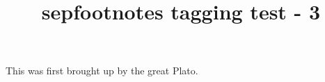 \documentclass{article}
\title{sepfootnotes tagging test - 3}
\begin{document}
This was first brought up by the great Plato.
\end{document}

